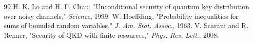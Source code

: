 \documentclass[journal,onecolumn,12pt,draftclsnofoot]{IEEEtran}
\begin{document}
\begin{thebibliography}{99}
 H. K. Lo and H. F. Chau, "Unconditional security of quantum key distribution over noisy channels," \emph{Science}, 1999.
 W. Hoeffding, "Probability inequalities for sums of bounded random variables," \emph{J. Am. Stat. Assoc.}, 1963.
 V. Scarani and R. Renner, "Security of QKD with finite resources," \emph{Phys. Rev. Lett.}, 2008.
\end{thebibliography}
\end{document}

